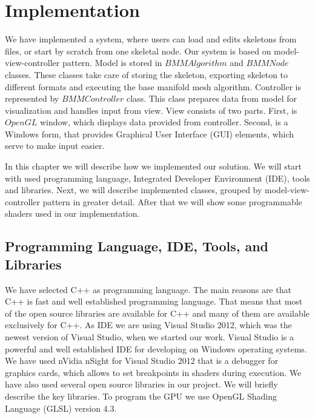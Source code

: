 \chapter{Implementation}

We have implemented a system, where users can load and edits skeletons from files, or start by scratch from one skeletal node.
Our system is based on model-view-controller pattern.
Model is stored in $BMMAlgorithm$ and $BMMNode$ classes.
These classes take care of storing the skeleton, exporting skeleton to different formats and executing the base manifold mesh algorithm.
Controller is represented by $BMMController$ class.
This class prepares data from model for visualization and handles input from view.
View consists of two parts.
First, is $OpenGL$ window, which displays data provided from controller.
Second, is a Windows form, that provides Graphical User Interface (GUI) elements, which serve to make input easier.

In this chapter we will describe how we implemented our solution.
We will start with used programming language, Integrated Developer Environment (IDE), tools and libraries.
Next, we will describe implemented classes, grouped by model-view-controller pattern in greater detail.
After that we will show some programmable shaders used in our implementation.

\section{Programming Language, IDE, Tools, and Libraries}

We have selected C++ as programming language.
The main reasons are that C++ is fast and well established programming language.
That means that most of the open source libraries are available for C++ and many of them are available exclusively for C++.
As IDE we are using Visual Studio 2012, which was the newest version of Visual Studio, when we started our work.
Visual Studio is a powerful and well established IDE for developing on Windows operating systems.
We have used nVidia nSight for Visual Studio 2012 that is a debugger for graphics cards, which allows to set breakpoints in shaders during execution. We have also used several open source libraries in our project. We will briefly describe the key libraries.
To program the GPU we use OpenGL Shading Language (GLSL) version 4.3.

